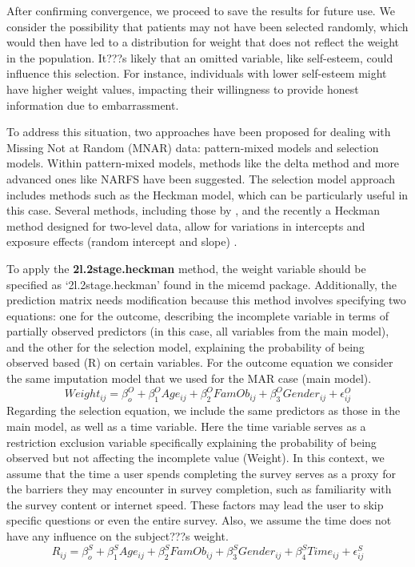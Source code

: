 \documentclass[
  article]{jss}
\begin{document}
After confirming convergence, we proceed to save the results for future
use. We consider the possibility that patients may not have been
selected randomly, which would then have led to a distribution for
weight that does not reflect the weight in the population. It???s likely
that an omitted variable, like self-esteem, could influence this
selection. For instance, individuals with lower self-esteem might have
higher weight values, impacting their willingness to provide honest
information due to embarrassment.

To address this situation, two approaches have been proposed for dealing
with Missing Not at Random (MNAR) data: pattern-mixed models and
selection models. Within pattern-mixed models, methods like the delta
method and more advanced ones like NARFS have been suggested. The
selection model approach includes methods such as the Heckman model,
which can be particularly useful in this case. Several methods,
including those by \cite{galimard2018}, and the recently a Heckman
method designed for two-level data, allow for variations in intercepts
and exposure effects (random intercept and slope) \cite{munoz2023}.

To apply the \textbf{2l.2stage.heckman} method, the weight variable
should be specified as `2l.2stage.heckman' found in the micemd package.
Additionally, the prediction matrix needs modification because this
method involves specifying two equations: one for the outcome,
describing the incomplete variable in terms of partially observed
predictors (in this case, all variables from the main model), and the
other for the selection model, explaining the probability of being
observed based (R) on certain variables. For the outcome equation we
consider the same imputation model that we used for the MAR case (main
model).
\[Weight_{ij}= \beta^O_{o} + \beta^O_{1}Age_{ij} + \beta^O_{2}FamOb_{ij}+ \beta^O_{3}Gender_{ij} + \epsilon^O_{ij}\]
Regarding the selection equation, we include the same predictors as
those in the main model, as well as a time variable. Here the time
variable serves as a restriction exclusion variable specifically
explaining the probability of being observed but not affecting the
incomplete value (Weight). In this context, we assume that the time a
user spends completing the survey serves as a proxy for the barriers
they may encounter in survey completion, such as familiarity with the
survey content or internet speed. These factors may lead the user to
skip specific questions or even the entire survey. Also, we assume the
time does not have any influence on the subject???s weight.
\[R_{ij}= \beta^S_{o} + \beta^S_{1}Age_{ij} + \beta^S_{2}FamOb_{ij}+ \beta^S_{3}Gender_{ij} +\beta^S_{4}Time_{ij}+ \epsilon^S_{ij}\]
\end{document}
